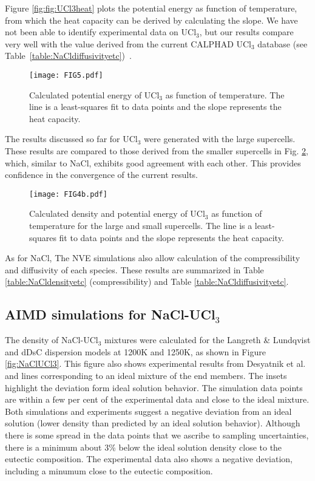 \documentclass[preprint,3p,10pt,twocolumn,number,sort&compress]{elsarticle}
\begin{document}
Figure \ref{fig:fig:UCl3heat} plots the potential energy as function of temperature, from which the heat capacity can be derived by calculating the slope. We have not been able to identify experimental data on UCl$_3$, but our results compare very well with the value derived from the current CALPHAD UCl$_3$ database (see Table~\ref{table:NaCldiffusivityetc})~\cite{}.

\begin{figure}[htb]
\centering
\texttt{[image: FIG5.pdf]}
\caption{Calculated potential energy of UCl$_3$ as function of temperature. The line is a least-squares fit to data points and the slope represents the heat capacity.} 
\label{fig:UCl3heat}
\end{figure}

The results discussed so far for UCl$_3$ were generated with the large supercells. These results are compared to those derived from the smaller supercells in Fig. \ref{fig:UCl3size}, which, similar to NaCl, exhibits good agreement with each other. This provides confidence in the convergence of the current results.

\begin{figure}[htb]
\centering
\texttt{[image: FIG4b.pdf]}
\caption{Calculated density and potential energy of UCl$_3$ as function of temperature for the large and small supercells. The line is a least-squares fit to data points and the slope represents the heat capacity.} 
\label{fig:UCl3size}
\end{figure}

As for NaCl, The NVE simulations also allow calculation of the compressibility and diffusivity of each species. These results are  summarized in Table \ref{table:NaCldensityetc} (compressibility) and Table \ref{table:NaCldiffusivityetc}.
 
\subsection{AIMD simulations for NaCl-UCl$_3$}
The density of NaCl-UCl$_3$ mixtures were calculated for the Langreth \& Lundqvist and dDsC dispersion models at 1200K and 1250K, as shown in Figure \ref{fig:NaClUCl3}. This figure also shows experimental results from Desyatnik et al.~\cite{} and lines corresponding to an ideal mixture of the end members. The insets highlight the deviation form ideal solution behavior. The simulation data points are within a few per cent of the experimental data and close to the ideal mixture. Both simulations and experiments suggest a negative deviation from an ideal solution (lower density than predicted by an ideal solution behavior). Although there is some spread in the data points that we ascribe to sampling uncertainties, there is a minimum about 3\% below the ideal solution density close to the eutectic composition. The experimental data also shows a negative deviation, including a minumum close to the eutectic composition.  
\end{document}
